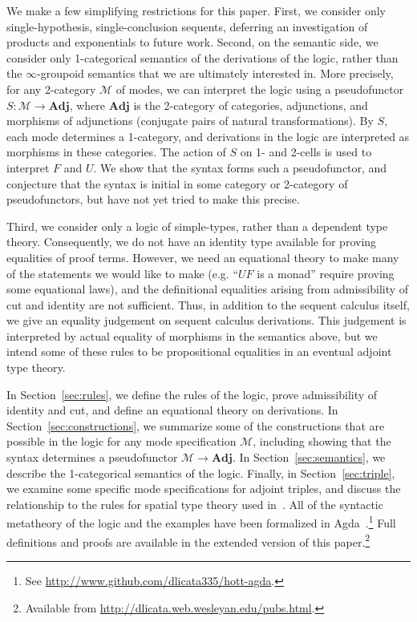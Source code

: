 \documentclass{drl-common/llncs}
\newcommand{\M}{\ensuremath{\mathcal{M}}}
\newcommand{\Adj}{\textbf{Adj}}
\begin{document}
We make a few simplifying restrictions for this paper. First, we
consider only single-hypothesis, single-conclusion sequents, deferring
an investigation of products and exponentials to future work.
Second, on the semantic side, we consider only 1-categorical semantics
of the derivations of the logic, rather than the $\infty$-groupoid
semantics that we are ultimately interested in.  More precisely, for any
2-category \M\/ of modes, we can interpret the logic using a
pseudofunctor $S : \M \to \Adj$, where $\Adj$ is the 2-category of
categories, adjunctions, and morphisms of adjunctions (conjugate pairs
of natural transformations).  By $S$, each mode determines a 1-category,
and derivations in the logic are interpreted as morphisms in these
categories.  The action of $S$ on 1- and 2-cells is used to interpret
$F$ and $U$.  We show that the syntax forms such a pseudofunctor, and
conjecture that the syntax is initial in some category or 2-category of
pseudofunctors, but have not yet tried to make this precise.

Third, we consider only a logic of simple-types, rather than a dependent
type theory.  Consequently, we do not have an identity type available
for proving equalities of proof terms.  However, we need an equational
theory to make many of the statements we would like to make (e.g. ``$UF$ is a monad''
require proving some equational laws), and the definitional equalities
arising from admissibility of cut and identity are not sufficient.
Thus, in addition to the sequent calculus itself, we give an equality
judgement on sequent calculus derivations.  This judgement is
interpreted by actual equality of morphisms in the semantics above, but
we intend some of these rules to be propositional equalities in an eventual
adjoint type theory.

In Section~\ref{sec:rules}, we define the rules of the logic, prove
admissibility of identity and cut, and define an equational theory on
derivations.  In Section~\ref{sec:constructions}, we summarize some of
the constructions that are possible in the logic for any mode
specification \M, including showing that the syntax determines a
pseudofunctor $\M \to \Adj$.  In Section~\ref{sec:semantics}, we
describe the 1-categorical semantics of the logic.  Finally, in
Section~\ref{sec:triple}, we examine some specific mode specifications
for adjoint triples, and discuss the relationship to the rules for
spatial type theory used in~\citep{shulman15realcohesion}.  All of the
syntactic metatheory of the logic and the examples have been formalized
in Agda~\citep{norell07thesis}.\footnote{See
  \url{http://www.github.com/dlicata335/hott-agda}.}
Full definitions and proofs are available in the extended version of
this paper.\footnote{Available from \url{http://dlicata.web.wesleyan.edu/pubs.html}.} 
\end{document}
